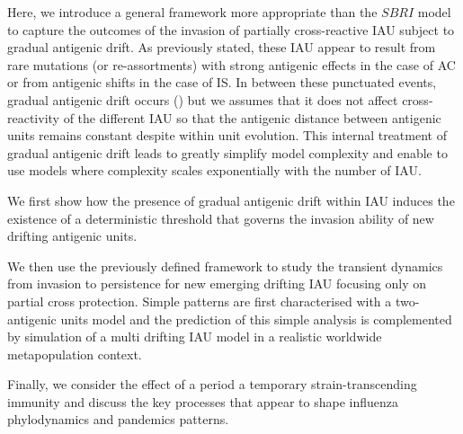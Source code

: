 Here, we introduce a general framework more appropriate than the
$SBRI$ model to capture the outcomes of the invasion of partially
cross-reactive IAU subject to gradual antigenic drift. As previously
stated, these IAU appear to result from rare mutations (or
re-assortments) with strong antigenic effects in the case of AC or
from antigenic shifts in the case of IS. In between these punctuated
events, gradual antigenic drift occurs (\citep{Shih2007, Russell2008,
  Suzuki2008}) but we assumes that it does not affect cross-reactivity
of the different IAU so that the antigenic distance between antigenic
units remains constant despite within unit evolution. This internal
treatment of gradual antigenic drift leads to greatly simplify model
complexity and enable to use models where complexity scales
exponentially with the number of IAU.

We first show how the presence of gradual antigenic drift within IAU
induces the existence of a deterministic threshold that governs the
invasion ability of new drifting antigenic units.

We then use the previously defined framework to study the transient
dynamics from invasion to persistence for new emerging drifting IAU
focusing only on partial cross protection. Simple patterns are first
characterised with a two-antigenic units model and the prediction of
this simple analysis is complemented by simulation of a multi drifting
IAU model in a realistic worldwide metapopulation context.

Finally, we consider the effect of a period a temporary
strain-transcending immunity and discuss the key processes that appear
to shape influenza phylodynamics and pandemics patterns.














